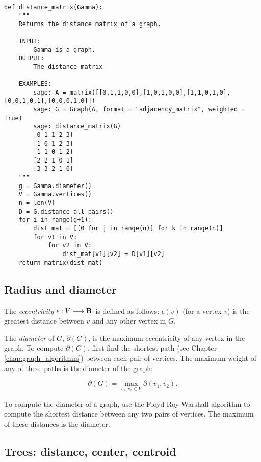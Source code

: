 \begin{lstlisting}
def distance_matrix(Gamma):
    """
    Returns the distance matrix of a graph.

    INPUT:
        Gamma is a graph.
    OUTPUT:
        The distance matrix

    EXAMPLES:
        sage: A = matrix([[0,1,1,0,0],[1,0,1,0,0],[1,1,0,1,0],[0,0,1,0,1],[0,0,0,1,0]])
        sage: G = Graph(A, format = "adjacency_matrix", weighted = True)
        sage: distance_matrix(G)
        [0 1 1 2 3]
        [1 0 1 2 3]
        [1 1 0 1 2]
        [2 2 1 0 1]
        [3 3 2 1 0]
    """
    g = Gamma.diameter()
    V = Gamma.vertices()
    n = len(V)
    D = G.distance_all_pairs()
    for i in range(g+1):
        dist_mat = [[0 for j in range(n)] for k in range(n)]
        for v1 in V:
            for v2 in V:
                dist_mat[v1][v2] = D[v1][v2]
    return matrix(dist_mat)
\end{lstlisting}



\subsection{Radius and diameter}

The {\it eccentricity} $\epsilon:V \longrightarrow  \mathbf{R}$ is defined as follows:
$\epsilon (v)$ (for a vertex $v$) is the greatest distance between $v$
and any other vertex in $G$.

The {\it diameter} of $G$, $\partial(G)$, is the maximum
eccentricity of any vertex in the graph. To compute
$\partial(G)$, first find the shortest path (see Chapter
\ref{chap:graph_algorithms}) between each pair of
vertices. The maximum weight of any of
these paths is the diameter of the graph:

\[
\partial(G) = \max_{v_1,v_2\in V} \partial(v_1,v_2).
\]

To compute the diameter of a graph, use the Floyd-Roy-Warshall
algorithm to compute the shortest distance between any
two pairs of vertices. The maximum of these distances is the
diameter.



\subsection{Trees: distance, center, centroid}


